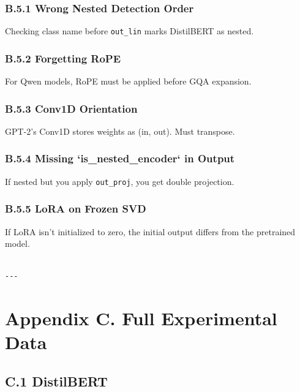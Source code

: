 \subsubsection{B.5.1 Wrong Nested Detection Order}

Checking class name before \texttt{out\_lin} marks DistilBERT as nested.

\subsubsection{B.5.2 Forgetting RoPE}

For Qwen models, RoPE must be applied before GQA expansion.

\subsubsection{B.5.3 Conv1D Orientation}

GPT-2's Conv1D stores weights as (in, out). Must transpose.

\subsubsection{B.5.4 Missing `is\_nested\_encoder` in Output}

If nested but you apply \texttt{out\_proj}, you get double projection.

\subsubsection{B.5.5 LoRA on Frozen SVD}

If LoRA isn't initialized to zero, the initial output differs from the 
pretrained model.
\begin{lstlisting}

---
\end{lstlisting}

\section{Appendix C. Full Experimental Data}

\subsection{C.1 DistilBERT}

